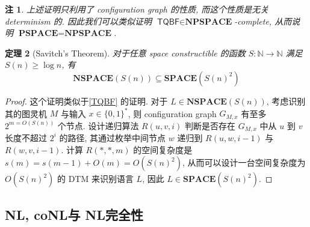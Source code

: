 \documentclass[8pt]{article}
\theoremstyle{compact}
\newtheorem{theorem}{定理}[section]
\newtheorem{remark}[theorem]{注}
\def\ge{\geqslant}
\def\SPACE{\textbf{SPACE}}
\def\NSPACE{\textbf{NSPACE}}
\def\PSPACE{\textbf{PSPACE}}
\def\NPSPACE{\textbf{NPSPACE}}
\def\NL{\textbf{NL}}
\def\coNL{\textbf{coNL}}
\begin{document}
\begin{remark}
	上述证明只利用了 configuration graph 的性质, 而这个性质是无关 determinism 的. 因此我们可以类似证明 $\textsf{TQBF} \in \NPSPACE$-complete, 从而说明 $\PSPACE = \NPSPACE$.
\end{remark}
\begin{theorem}[Savitch's Theorem]
	对于任意 space constructible 的函数 $S: \mathbb N \to \mathbb N$ 满足 $S(n) \ge \log n$, 有 $$\NSPACE(S(n)) \subseteq \SPACE(S(n)^2)$$
\end{theorem}
\begin{proof}
	这个证明类似于\cref{TQBF} 的证明. 对于 $L \in \NSPACE(S(n))$, 考虑识别其的图灵机 $M$ 与输入 $x \in \{0, 1\}^*$, 则 configuration graph $G_{M, x}$ 有至多 $2^{m = O(S(n))}$ 个节点. 设计递归算法 $R(u, v, i)$ 判断是否存在 $G_{M, x}$ 中从 $u$ 到 $v$ 长度不超过 $2^i$ 的路径, 其通过枚举中间节点 $w$ 递归到 $R(u, w, i - 1)$ 与 $R(w, v, i - 1)$. 计算 $R(*, *, m)$ 的空间复杂度是 $s(m) = s(m - 1) + O(m) = O(S(n)^2)$, 从而可以设计一台空间复杂度为 $O(S(n)^2)$ 的 DTM 来识别语言 $L$, 因此 $L \in \SPACE(S(n)^2)$.
\end{proof}


\subsection{\NL, \coNL 与 \NL 完全性}
\end{document}

